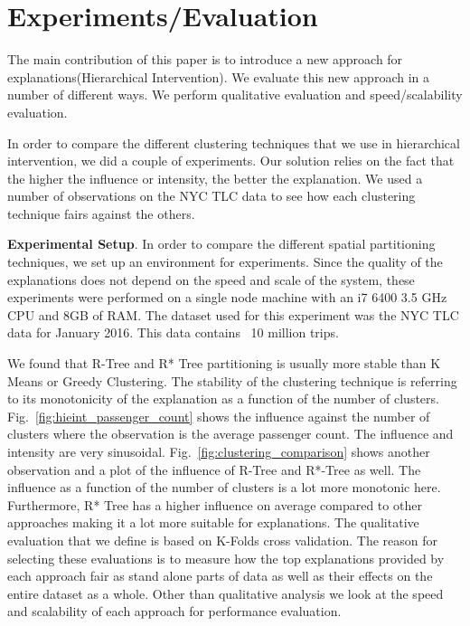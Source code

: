 \chapter{Experiments/Evaluation}
\label{chp:eval}
\label{sec:evaluation}
The main contribution of this paper is to introduce a new approach for explanations(Hierarchical Intervention). We evaluate this new approach in a number of different ways. We perform qualitative evaluation and speed/scalability evaluation.

In order to compare the different clustering techniques that we use in hierarchical intervention, we did a couple of experiments. Our solution relies on the fact that the higher the influence or intensity, the better the explanation. We used a number of observations on the NYC TLC data to see how each clustering technique fairs against the others.

\textbf{Experimental Setup}. In order to compare the different spatial partitioning techniques, we set up an environment for experiments. Since the quality of the explanations does not depend on the speed and scale of the system, these experiments were performed on a single node machine with an i7 6400 3.5 GHz CPU and 8GB of RAM. The dataset used for this experiment was the NYC TLC data for January 2016. This data contains ~10 million trips.

We found that R-Tree and R* Tree partitioning is usually more stable than K Means or Greedy Clustering. The stability of the clustering technique is referring to its monotonicity of the explanation as a function of the number of clusters. Fig.~\ref{fig:hieint_passenger_count} shows the influence against the number of clusters where the observation is the average passenger count. The influence and intensity are very sinusoidal. Fig.~\ref{fig:clustering_comparison} shows another observation and a plot of the influence of R-Tree and R*-Tree as well. The influence as a function of the number of clusters is a lot more monotonic here. Furthermore, R* Tree has a higher influence on average compared to other approaches making it a lot more suitable for explanations.
The qualitative evaluation that we define is based on K-Folds cross validation. The reason for selecting these evaluations is to measure how the top explanations provided by each approach fair as stand alone parts of data as well as their effects on the entire dataset as a whole. Other than qualitative analysis we look at the speed and scalability of each approach for performance evaluation.

